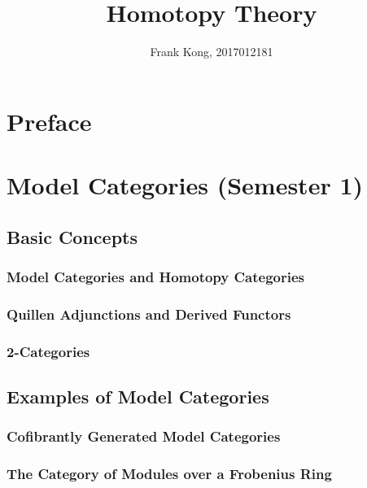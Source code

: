\documentclass[12pt]{report}
\begin{document}
\title{\Huge \textbf{Homotopy Theory}}
\author{\Large Frank Kong, 2017012181}
\maketitle

\chapter*{Preface}



\tableofcontents

\chapter{Model Categories (Semester 1)}



\section{Basic Concepts}

\subsection{Model Categories and Homotopy Categories}



\subsection{Quillen Adjunctions and Derived Functors}



\subsection{2-Categories}



\section{Examples of Model Categories}

\subsection{Cofibrantly Generated Model Categories}



\subsection{The Category of Modules over a Frobenius Ring}
\end{document}
